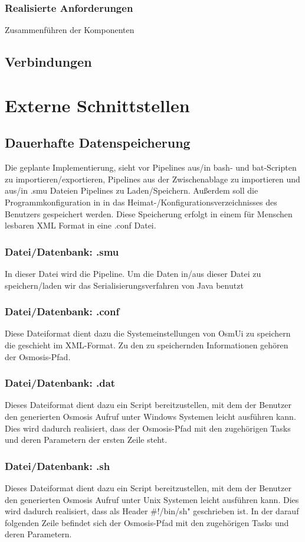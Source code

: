 \documentclass[a4paper,12pt]{scrartcl}
\begin{document}
\subsubsection{Realisierte Anforderungen}
Zusammenführen der Komponenten


\subsection{Verbindungen}
\section{Externe Schnittstellen}
\subsection{Dauerhafte Datenspeicherung}
Die geplante Implementierung, sieht vor Pipelines aus/in bash- und bat-Scripten zu importieren/exportieren, Pipelines aus der Zwischenablage zu importieren und aus/in .smu Dateien Pipelines zu Laden/Speichern. Außerdem soll die Programmkonfiguration in in das Heimat-/Konfigurationsverzeichnisses des Benutzers gespeichert werden. Diese Speicherung erfolgt in einem für Menschen lesbaren XML Format in eine .conf Datei.
\subsubsection{Datei/Datenbank: .smu}
In dieser Datei wird die Pipeline. Um die Daten in/aus dieser Datei zu speichern/laden wir das Serialisierungsverfahren von Java benutzt 
\subsubsection{Datei/Datenbank: .conf}
Diese  Dateiformat dient dazu die Systemeinstellungen von OsmUi zu speichern die geschieht im XML-Format. Zu den zu speichernden Informationen gehören der Osmosis-Pfad.
\subsubsection{Datei/Datenbank: .dat}
Dieses Dateiformat dient dazu ein Script bereitzustellen, mit dem der Benutzer den generierten Osmosis Aufruf unter Windows Systemen leicht ausführen kann. Dies wird dadurch realisiert, dass der Osmosis-Pfad mit den zugehörigen Tasks und deren Parametern der ersten Zeile steht.
\subsubsection{Datei/Datenbank: .sh}
Dieses Dateiformat dient dazu ein Script bereitzustellen, mit dem der Benutzer den generierten Osmosis Aufruf unter Unix Systemen leicht ausführen kann. Dies wird dadurch realisiert, dass als Header \glqq \#!/bin/sh" geschrieben ist. In der darauf folgenden Zeile befindet sich der Osmosis-Pfad mit den zugehörigen Tasks und deren Parametern.
\end{document}
